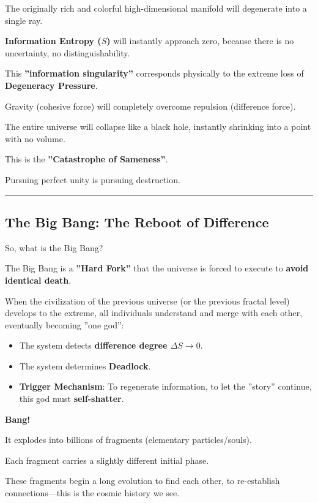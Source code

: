 The originally rich and colorful high-dimensional manifold will degenerate into a single ray.

\textbf{Information Entropy ($S$)} will instantly approach zero, because there is no uncertainty, no distinguishability.

This \textbf{''information singularity''} corresponds physically to the extreme loss of \textbf{Degeneracy Pressure}.

Gravity (cohesive force) will completely overcome repulsion (difference force).

The entire universe will collapse like a black hole, instantly shrinking into a point with no volume.

This is the \textbf{''Catastrophe of Sameness''}.

Pursuing perfect unity is pursuing destruction.

\hrule

\subsection{The Big Bang: The Reboot of Difference}

So, what is the Big Bang?

The Big Bang is a \textbf{''Hard Fork''} that the universe is forced to execute to \textbf{avoid identical death}.

When the civilization of the previous universe (or the previous fractal level) develops to the extreme, all individuals understand and merge with each other, eventually becoming ''one god'':

\begin{itemize}
\item The system detects \textbf{difference degree $\Delta S \to 0$}.

\item The system determines \textbf{Deadlock}.

\item \textbf{Trigger Mechanism}: To regenerate information, to let the ''story'' continue, this god must \textbf{self-shatter}.
\end{itemize}

\textbf{Bang!}

It explodes into billions of fragments (elementary particles/souls).

Each fragment carries a slightly different initial phase.

These fragments begin a long evolution to find each other, to re-establish connections---this is the cosmic history we see.

